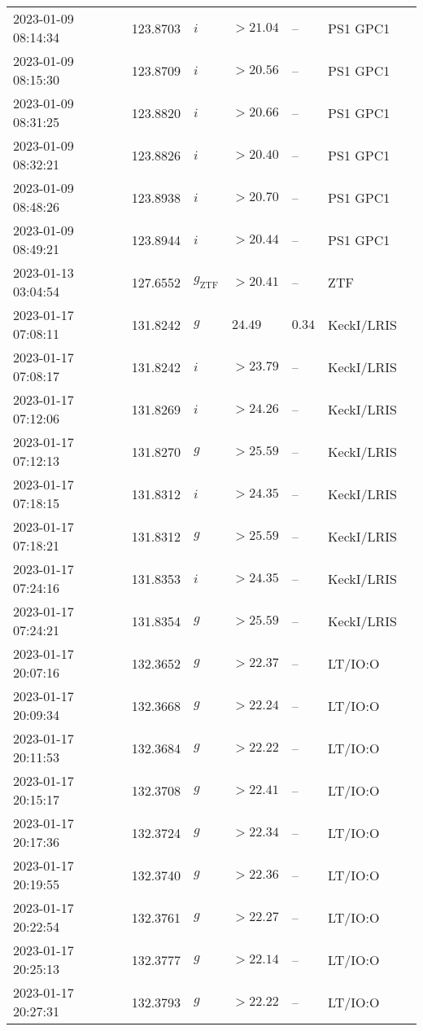 \documentclass{nature_plusfigure}
\begin{document}
\begin{supplement}
\begin{center}
\begin{longtable}{lllllll}
2023-01-09 08:14:34 & 123.8703 & $i$ & $>21.04$ & -- & PS1 GPC1 &  \\ 
2023-01-09 08:15:30 & 123.8709 & $i$ & $>20.56$ & -- & PS1 GPC1 &  \\ 
2023-01-09 08:31:25 & 123.8820 & $i$ & $>20.66$ & -- & PS1 GPC1 &  \\ 
2023-01-09 08:32:21 & 123.8826 & $i$ & $>20.40$ & -- & PS1 GPC1 &  \\ 
2023-01-09 08:48:26 & 123.8938 & $i$ & $>20.70$ & -- & PS1 GPC1 &  \\ 
2023-01-09 08:49:21 & 123.8944 & $i$ & $>20.44$ & -- & PS1 GPC1 &  \\ 
2023-01-13 03:04:54 & 127.6552 & ${g}_\mathrm{ZTF}$ & $>20.41$ & -- & ZTF &  \\ 
2023-01-17 07:08:11 & 131.8242 & $g$ & $24.49$ & $0.34$ & KeckI/LRIS &  \\ 
2023-01-17 07:08:17 & 131.8242 & $i$ & $>23.79$ & -- & KeckI/LRIS &  \\ 
2023-01-17 07:12:06 & 131.8269 & $i$ & $>24.26$ & -- & KeckI/LRIS &  \\ 
2023-01-17 07:12:13 & 131.8270 & $g$ & $>25.59$ & -- & KeckI/LRIS &  \\ 
2023-01-17 07:18:15 & 131.8312 & $i$ & $>24.35$ & -- & KeckI/LRIS &  \\ 
2023-01-17 07:18:21 & 131.8312 & $g$ & $>25.59$ & -- & KeckI/LRIS &  \\ 
2023-01-17 07:24:16 & 131.8353 & $i$ & $>24.35$ & -- & KeckI/LRIS &  \\ 
2023-01-17 07:24:21 & 131.8354 & $g$ & $>25.59$ & -- & KeckI/LRIS &  \\ 
2023-01-17 20:07:16 & 132.3652 & $g$ & $>22.37$ & -- & LT/IO:O &  \\ 
2023-01-17 20:09:34 & 132.3668 & $g$ & $>22.24$ & -- & LT/IO:O &  \\ 
2023-01-17 20:11:53 & 132.3684 & $g$ & $>22.22$ & -- & LT/IO:O &  \\ 
2023-01-17 20:15:17 & 132.3708 & $g$ & $>22.41$ & -- & LT/IO:O &  \\ 
2023-01-17 20:17:36 & 132.3724 & $g$ & $>22.34$ & -- & LT/IO:O &  \\ 
2023-01-17 20:19:55 & 132.3740 & $g$ & $>22.36$ & -- & LT/IO:O &  \\ 
2023-01-17 20:22:54 & 132.3761 & $g$ & $>22.27$ & -- & LT/IO:O &  \\ 
2023-01-17 20:25:13 & 132.3777 & $g$ & $>22.14$ & -- & LT/IO:O &  \\ 
2023-01-17 20:27:31 & 132.3793 & $g$ & $>22.22$ & -- & LT/IO:O &  \\ 

\end{longtable}
\end{center}
\end{supplement}
\end{document}
